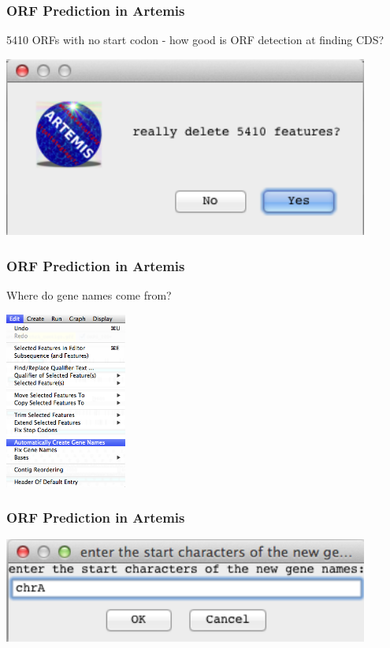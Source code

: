 \documentclass[table]{beamer}
\begin{document}
    \begin{frame}
      \frametitle{ORF Prediction in Artemis} 
      5410 ORFs with no start codon - how good is ORF detection at finding CDS?
      \begin{center}
        \includegraphics[width=0.9\textwidth]{images/artemis_orf11}     
      \end{center}
    \end{frame}

    \begin{frame}
      \frametitle{ORF Prediction in Artemis}
      Where do gene names come from?
      \begin{center}
        \includegraphics[width=0.3\textwidth]{images/artemis_orf12}     
      \end{center}
    \end{frame}

    \begin{frame}
      \frametitle{ORF Prediction in Artemis}    
      \begin{center}
        \includegraphics[width=0.9\textwidth]{images/artemis_orf13}     
      \end{center}
    \end{frame}
\end{document}
